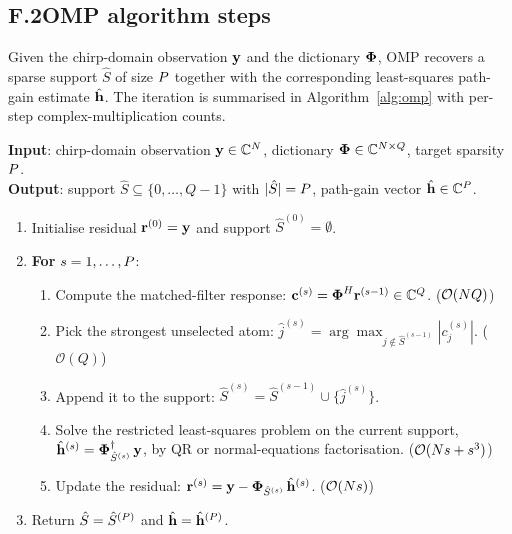 \subsection*{F.2\quad OMP algorithm steps}

Given the chirp-domain observation $\mathbf{y}$ and the dictionary $\boldsymbol{\Phi}$, OMP recovers a sparse support $\hat{S}$ of size $P$ together with the corresponding least-squares path-gain estimate $\hat{\mathbf{h}}$. The iteration is summarised in Algorithm~\ref{alg:omp} with per-step complex-multiplication counts.

\begin{algorithm}[t]
\caption{Orthogonal Matching Pursuit on the chirp-domain pilot dictionary~\cite{tropp2007signal}.}
\label{alg:omp}
\begin{small}
\textbf{Input}: chirp-domain observation $\mathbf{y} \in \mathbb{C}^{N}$, dictionary $\boldsymbol{\Phi} \in \mathbb{C}^{N \times Q}$, target sparsity $P$. \\
\textbf{Output}: support $\hat{S} \subseteq \{0, \dots, Q-1\}$ with $|\hat{S}| = P$, path-gain vector $\hat{\mathbf{h}} \in \mathbb{C}^{P}$.
\begin{enumerate}[leftmargin=*,itemsep=1pt,topsep=2pt]
  \item Initialise residual $\mathbf{r}^{(0)} = \mathbf{y}$ and support $\hat{S}^{(0)} = \emptyset$.
  \item \textbf{For} $s = 1, \dots, P$:
  \begin{enumerate}[leftmargin=*,itemsep=1pt,topsep=2pt]
    \item Compute the matched-filter response: $\mathbf{c}^{(s)} = \boldsymbol{\Phi}^H \mathbf{r}^{(s-1)} \in \mathbb{C}^{Q}$. \hfill ($\mathcal{O}(N Q)$)
    \item Pick the strongest unselected atom: $\hat{j}^{(s)} = \arg\max_{j \notin \hat{S}^{(s-1)}} |c_j^{(s)}|$. \hfill ($\mathcal{O}(Q)$)
    \item Append it to the support: $\hat{S}^{(s)} = \hat{S}^{(s-1)} \cup \{\hat{j}^{(s)}\}$.
    \item Solve the restricted least-squares problem on the current support, $\hat{\mathbf{h}}^{(s)} = \boldsymbol{\Phi}_{\hat{S}^{(s)}}^{\dagger}\, \mathbf{y}$, by QR or normal-equations factorisation. \hfill ($\mathcal{O}(N s + s^3)$)
    \item Update the residual: $\mathbf{r}^{(s)} = \mathbf{y} - \boldsymbol{\Phi}_{\hat{S}^{(s)}}\, \hat{\mathbf{h}}^{(s)}$. \hfill ($\mathcal{O}(N s)$)
  \end{enumerate}
  \item Return $\hat{S} = \hat{S}^{(P)}$ and $\hat{\mathbf{h}} = \hat{\mathbf{h}}^{(P)}$.
\end{enumerate}
\end{small}
\end{algorithm}


